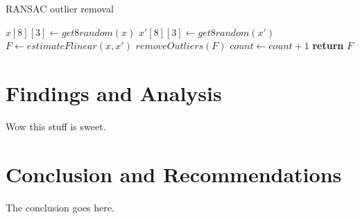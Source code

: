 \documentclass[Conference]{IEEEtran}
\begin{document}
\begin{algorithm*}
    \caption{RANSAC outlier removal}
    \begin{algorithmic}[1]
            \State $x[8][3]\gets get8random(x)$
            \State $x'[8][3]\gets get8random(x')$
            \State $F\gets estimateFlinear(x, x')$
            \State $removeOutliers(F)$
            \State $count\gets count+1$
        \EndWhile\label{RANSACOutliers}
        \State \textbf{return} $F$
        \EndProcedure
    \end{algorithmic}
\label{algo:RANSAC}
\end{algorithm*}


\section{Findings and Analysis}
Wow this stuff is sweet.

\section{Conclusion and Recommendations}
The conclusion goes here.

{}

\end{document}
